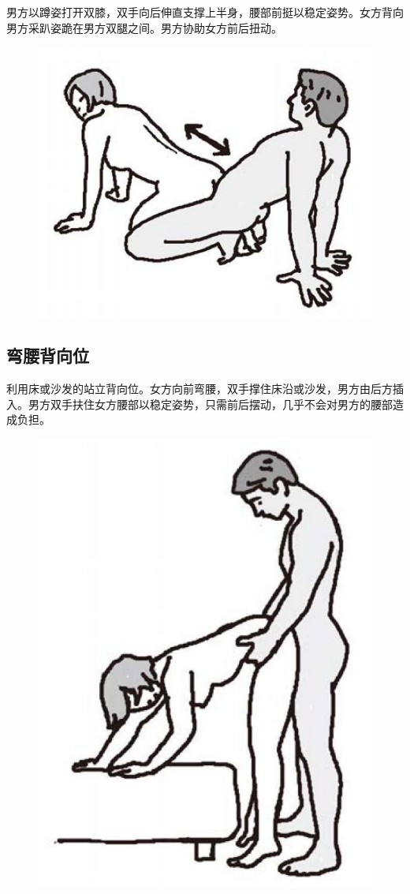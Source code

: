 \documentclass[12pt,UTF8]{ctexbook}
\begin{document}
男方以蹲姿打开双膝，双手向后伸直支撑上半身，腰部前挺以稳定姿势。女方背向男方采趴姿跪在男方双腿之间。男方协助女方前后扭动。

\begin{figure}[htbp]
	\centering
	\includegraphics[width=0.7\linewidth]{tw11}
	\caption{}
	\label{fig:1}
\end{figure}

\subsection{弯腰背向位}

利用床或沙发的站立背向位。女方向前弯腰，双手撑住床沿或沙发，男方由后方插入。男方双手扶住女方腰部以稳定姿势，只需前后摆动，几乎不会对男方的腰部造成负担。

\begin{figure}[htbp]
	\centering
	\includegraphics[width=0.7\linewidth]{tw12}
	\caption{}
	\label{fig:1}
\end{figure}
\end{document}
